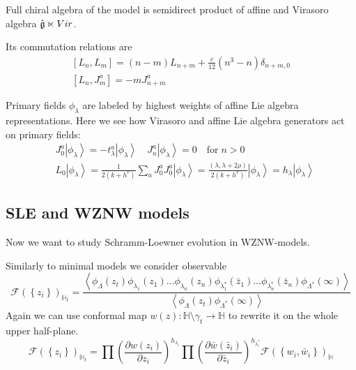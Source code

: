 Full chiral algebra of the model is semidirect product of affine and Virasoro algebra $\hat{\mathfrak{g}} \ltimes Vir$. 

Its commutation relations are
  \begin{equation}
    \label{eq:92}
    \begin{aligned}
      \left[L_n,L_m\right]=(n-m)L_{n+m}+\frac{c}{12}(n^3-n)\delta_{n+m,0}\\
      \left[L_n,J^a_m\right]=-mJ^a_{n+m}
    \end{aligned}
  \end{equation}

Primary fields  $\phi_{\lambda}$ are labeled by highest weights of affine Lie algebra representations. Here we see how Virasoro and affine Lie algebra generators act on primary fields:
  \begin{equation*}
    \begin{aligned}
      & J_0^a\left|\phi_{\lambda}\right>=-t^a_{\lambda}\left|\phi_{\lambda}\right>  \quad    J^a_n\left|\phi_{\lambda}\right>=0 \quad \mbox{for}\; n>0 \\
      & L_0\left|\phi_{\lambda}\right>=\frac{1}{2(k+h^v)}\sum_aJ^a_0J^a_0\left|\phi_{\lambda}\right>=\frac{(\lambda,\lambda+2\rho)}{2(k+h^v)}\left|\phi_{\lambda}\right>=h_{\lambda} \left|\phi_{\lambda}\right>
    \end{aligned}
  \end{equation*}


\subsection{SLE and WZNW models}
Now we want to study Schramm-Loewner evolution in WZNW-models.

Similarly to minimal models we consider observable
\begin{equation*}
  \mathcal{F}(\left\{z_{i}\right\})_{\mathbb{H}_{t}}=
  \frac{\left<\phi_{\Lambda}(z_{t}) \phi_{\lambda_1}(z_{1}) \dots \phi_{\lambda_n}(z_{n}) \phi_{\lambda^{*}_1}(\bar z_{1}) \dots \phi_{\lambda^{*}_n}(\bar z_{n})
      \phi_{\Lambda^{*}}(\infty)\right>}{\left<\phi_{\Lambda}(z_{t})\phi_{\Lambda^{*}}(\infty)\right>}
\end{equation*}
Again we can use conformal map  $w(z):\mathbb{H}\setminus\gamma_{t}\to \mathbb{H}$ to rewrite it on the whole upper half-plane. 
\begin{equation*}
  \mathcal{F}(\left\{z_{i}\right\})_{\mathbb{H}_{t}}=\prod \left(\frac{\partial w(z_{i})}{\partial z_{i}}\right)^{h_{\lambda_i}} 
  \prod \left(\frac{\partial \bar w(\bar z_{i})}{\partial \bar z_{i}}\right)^{h_{\lambda^{*}_i}}
  \mathcal{F}(\left\{w_{i}, \bar w_{i}\right\})_{\mathbb{H}}
\end{equation*}

